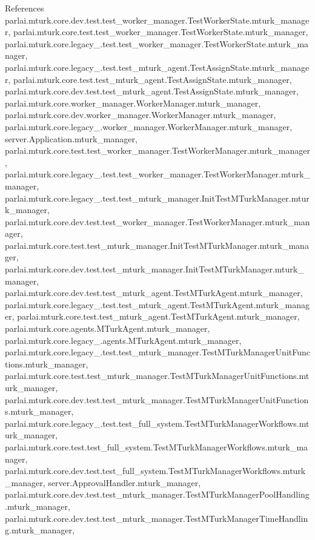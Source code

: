 References parlai.\+mturk.\+core.\+dev.\+test.\+test\+\_\+worker\+\_\+manager.\+Test\+Worker\+State.\+mturk\+\_\+manager, parlai.\+mturk.\+core.\+test.\+test\+\_\+worker\+\_\+manager.\+Test\+Worker\+State.\+mturk\+\_\+manager, parlai.\+mturk.\+core.\+legacy\+\_.\+test.\+test\+\_\+worker\+\_\+manager.\+Test\+Worker\+State.\+mturk\+\_\+manager, parlai.\+mturk.\+core.\+legacy\+\_.\+test.\+test\+\_\+mturk\+\_\+agent.\+Test\+Assign\+State.\+mturk\+\_\+manager, parlai.\+mturk.\+core.\+test.\+test\+\_\+mturk\+\_\+agent.\+Test\+Assign\+State.\+mturk\+\_\+manager, parlai.\+mturk.\+core.\+dev.\+test.\+test\+\_\+mturk\+\_\+agent.\+Test\+Assign\+State.\+mturk\+\_\+manager, parlai.\+mturk.\+core.\+worker\+\_\+manager.\+Worker\+Manager.\+mturk\+\_\+manager, parlai.\+mturk.\+core.\+dev.\+worker\+\_\+manager.\+Worker\+Manager.\+mturk\+\_\+manager, parlai.\+mturk.\+core.\+legacy\+\_.\+worker\+\_\+manager.\+Worker\+Manager.\+mturk\+\_\+manager, server.\+Application.\+mturk\+\_\+manager, parlai.\+mturk.\+core.\+test.\+test\+\_\+worker\+\_\+manager.\+Test\+Worker\+Manager.\+mturk\+\_\+manager, parlai.\+mturk.\+core.\+legacy\+\_.\+test.\+test\+\_\+worker\+\_\+manager.\+Test\+Worker\+Manager.\+mturk\+\_\+manager, parlai.\+mturk.\+core.\+legacy\+\_.\+test.\+test\+\_\+mturk\+\_\+manager.\+Init\+Test\+M\+Turk\+Manager.\+mturk\+\_\+manager, parlai.\+mturk.\+core.\+dev.\+test.\+test\+\_\+worker\+\_\+manager.\+Test\+Worker\+Manager.\+mturk\+\_\+manager, parlai.\+mturk.\+core.\+test.\+test\+\_\+mturk\+\_\+manager.\+Init\+Test\+M\+Turk\+Manager.\+mturk\+\_\+manager, parlai.\+mturk.\+core.\+dev.\+test.\+test\+\_\+mturk\+\_\+manager.\+Init\+Test\+M\+Turk\+Manager.\+mturk\+\_\+manager, parlai.\+mturk.\+core.\+dev.\+test.\+test\+\_\+mturk\+\_\+agent.\+Test\+M\+Turk\+Agent.\+mturk\+\_\+manager, parlai.\+mturk.\+core.\+legacy\+\_.\+test.\+test\+\_\+mturk\+\_\+agent.\+Test\+M\+Turk\+Agent.\+mturk\+\_\+manager, parlai.\+mturk.\+core.\+test.\+test\+\_\+mturk\+\_\+agent.\+Test\+M\+Turk\+Agent.\+mturk\+\_\+manager, parlai.\+mturk.\+core.\+agents.\+M\+Turk\+Agent.\+mturk\+\_\+manager, parlai.\+mturk.\+core.\+legacy\+\_.\+agents.\+M\+Turk\+Agent.\+mturk\+\_\+manager, parlai.\+mturk.\+core.\+legacy\+\_.\+test.\+test\+\_\+mturk\+\_\+manager.\+Test\+M\+Turk\+Manager\+Unit\+Functions.\+mturk\+\_\+manager, parlai.\+mturk.\+core.\+test.\+test\+\_\+mturk\+\_\+manager.\+Test\+M\+Turk\+Manager\+Unit\+Functions.\+mturk\+\_\+manager, parlai.\+mturk.\+core.\+dev.\+test.\+test\+\_\+mturk\+\_\+manager.\+Test\+M\+Turk\+Manager\+Unit\+Functions.\+mturk\+\_\+manager, parlai.\+mturk.\+core.\+legacy\+\_.\+test.\+test\+\_\+full\+\_\+system.\+Test\+M\+Turk\+Manager\+Workflows.\+mturk\+\_\+manager, parlai.\+mturk.\+core.\+test.\+test\+\_\+full\+\_\+system.\+Test\+M\+Turk\+Manager\+Workflows.\+mturk\+\_\+manager, parlai.\+mturk.\+core.\+dev.\+test.\+test\+\_\+full\+\_\+system.\+Test\+M\+Turk\+Manager\+Workflows.\+mturk\+\_\+manager, server.\+Approval\+Handler.\+mturk\+\_\+manager, parlai.\+mturk.\+core.\+dev.\+test.\+test\+\_\+mturk\+\_\+manager.\+Test\+M\+Turk\+Manager\+Pool\+Handling.\+mturk\+\_\+manager, parlai.\+mturk.\+core.\+dev.\+test.\+test\+\_\+mturk\+\_\+manager.\+Test\+M\+Turk\+Manager\+Time\+Handling.\+mturk\+\_\+manager, 